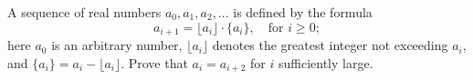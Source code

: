 A sequence of real numbers $a_0, a_1, a_2, \ldots$ is defined by the formula
\[ a_{i+1} = \lfloor a_i \rfloor \cdot \{a_i\}, \quad \text{for } i \geq 0; \]
here $a_0$ is an arbitrary number, $\lfloor a_i \rfloor$ denotes the greatest integer not exceeding $a_i$, and $\{a_i\} = a_i - \lfloor a_i \rfloor$. Prove that $a_i = a_{i+2}$ for $i$ sufficiently large.
